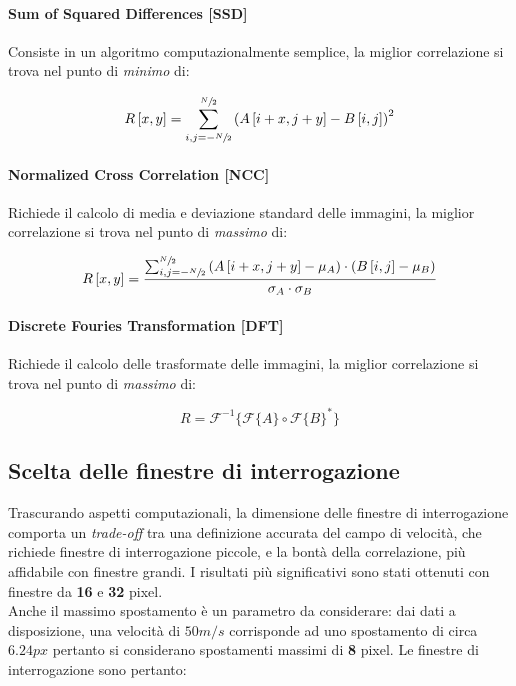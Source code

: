 \documentclass[a4paper]{article}
\begin{document}
\paragraph{Sum of Squared Differences [SSD]} Consiste in un algoritmo computazionalmente semplice, la miglior correlazione si trova nel punto di \textit{minimo} di:

\begin{equation}
R\left[x,y \right] = \sum_{i,j=-\sfrac{N}{2}}^{\sfrac{N}{2}} \left( A\left[i+x,j+y\right] - B\left[i,j \right] \right)^2
\label{eq:ssd}
\end{equation}

\paragraph{Normalized Cross Correlation [NCC]}\cite{ncc} Richiede il calcolo di media e deviazione standard delle immagini, la miglior correlazione si trova nel punto di \textit{massimo} di:

\begin{equation}
R\left[x,y \right] = \frac{ \sum_{i,j=-\sfrac{N}{2}}^{\sfrac{N}{2}} \left( A\left[i+x,j+y\right] - \mu_A \right) \cdot \left( B\left[i,j \right] - \mu_B \right) } { \sigma_A \cdot \sigma_B }
\label{eq:ncc}
\end{equation}


\paragraph{Discrete Fouries Transformation [DFT]} Richiede il calcolo delle trasformate delle immagini, la miglior correlazione si trova nel punto di \textit{massimo} di:

\begin{equation}
R = \mathscr{F}^{-1} \{ \mathscr{F}\{A\} \circ \mathscr{F}\{B\}^*    \}
\label{eq:dft}
\end{equation}

\subsection{Scelta delle finestre di interrogazione}

Trascurando aspetti computazionali, la dimensione delle finestre di interrogazione comporta un \textit{trade-off} tra una definizione accurata del campo di velocità, che richiede finestre di interrogazione piccole, e la bontà della correlazione, più affidabile con finestre grandi. I risultati più significativi sono stati ottenuti con finestre da \textbf{16} e \textbf{32} pixel.\\
Anche il massimo spostamento è un parametro da considerare: dai dati a disposizione, una velocità di $50 m/s$ corrisponde ad uno spostamento di circa $6.24px$ pertanto si considerano spostamenti massimi di \textbf{8} pixel. Le finestre di interrogazione sono pertanto:
\end{document}
